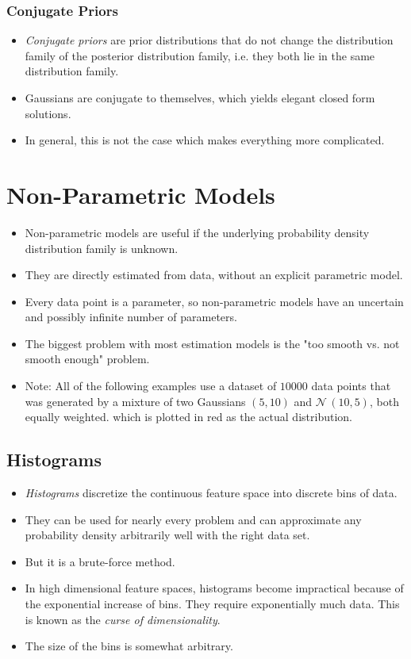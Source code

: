 			\subsubsection{Conjugate Priors}
				\begin{itemize}
					\item \emph{Conjugate priors} are prior distributions that do not change the distribution family of the posterior distribution family, i.e. they both lie in the same distribution family.
					\item Gaussians are conjugate to themselves, which yields elegant closed form solutions.
					\item In general, this is not the case which makes everything more complicated.
				\end{itemize}

	\section{Non-Parametric Models}
		\begin{itemize}
			\item Non-parametric models are useful if the underlying probability density distribution family is unknown.
			\item They are directly estimated from data, without an explicit parametric model.
			\item Every data point is a parameter, so non-parametric models have an uncertain and possibly infinite number of parameters.
			\item The biggest problem with most estimation models is the "too smooth vs. not smooth enough" problem.
			\item Note: All of the following examples use a dataset of \(10000\) data points that was generated by a mixture of two Gaussians \(
				(5, 10) \) and \( \mathcal{N}\,(10, 5) \), both equally weighted. which is plotted in red as the actual distribution.
		\end{itemize}

		\subsection{Histograms}
			\begin{itemize}
				\item \emph{Histograms} discretize the continuous feature space into discrete bins of data.
				\item They can be used for nearly every problem and can approximate any probability density arbitrarily well with the right data set.
				\item But it is a brute-force method.
				\item In high dimensional feature spaces, histograms become impractical because of the exponential increase of bins. They require exponentially much data. This is known as the \emph{curse of dimensionality}.
				\item The size of the bins is somewhat arbitrary.
			\end{itemize}


